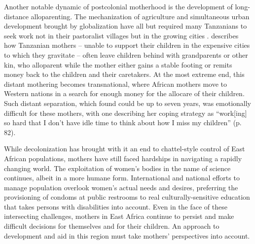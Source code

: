 \documentclass[american]{../../../coursework}
\begin{document}
Another notable dynamic of postcolonial motherhood is the development of
long-distance alloparenting. The mechanization of agriculture and simultaneous
urban development brought by globalization have all but required many
Tanzanians to seek work not in their pastoralist villages but in the growing
cities \parencite{Coc19}. \textcite{Kyo15} describes how Tanzanian mothers --
unable to support their children in the expensive cities to which they
gravitate -- often leave children behind with grandparents or other kin, who
alloparent while the mother either gains a stable footing or remits money back
to the children and their caretakers. At the most extreme end, this distant
mothering becomes transnational, where African mothers move to Western nations
in a search for enough money for the allocare of their children. Such distant
separation, which \textcite{Kyo15} found could be up to seven years, was
emotionally difficult for these mothers, with one describing her coping
strategy as ``work[ing] so hard that I don't have idle time to think about how
I miss my children'' (p. 82).

While decolonization has brought with it an end to chattel-style control of
East African populations, mothers have still faced hardships in navigating a
rapidly changing world. The exploitation of women's bodies in the name of
science continues, albeit in a more humane form. International and national
efforts to manage population overlook women's actual needs and desires,
preferring the provisioning of condoms at public restrooms to real
culturally-sensitive education that takes persons with disabilities into
account.
Even in the face of
these intersecting challenges, mothers in East Africa continue to persist and
make difficult decisions for themselves and for their children. An approach to
development and aid in this region must take mothers' perspectives into
account.

\printbibliography
\end{document}

